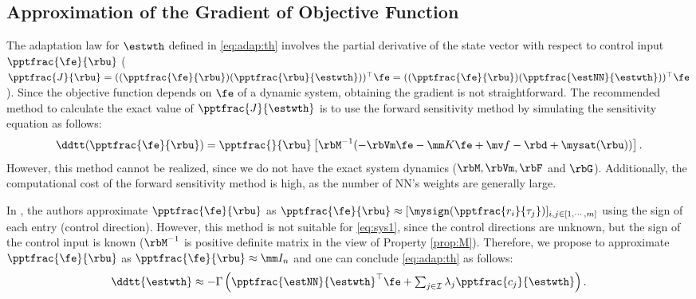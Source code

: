 \documentclass[final,5p,times,twocolumn,authoryear]{elsarticle}
\begin{document}
\subsection{Approximation of the Gradient of Objective Function}

The adaptation law for $\estwth$ defined in \eqref{eq:adap:th} involves the partial derivative of the state vector with respect to control input $\pptfrac{\fe}{\rbu}$ (\ie 
$
    \pptfrac{J}{\rbu}
    =
    ((\pptfrac{\fe}{\rbu})(\pptfrac{\rbu}{\estwth}))^\top \fe
    =
    ((\pptfrac{\fe}{\rbu})(\pptfrac{\estNN}{\estwth}))^\top \fe
$). 
Since the objective function depends on $\fe$ of a dynamic system, obtaining the gradient is not straightforward. 
The recommended method to calculate the exact value of $\pptfrac{J}{\estwth}$ is to use the forward sensitivity method \cite{Sengupta:2014aa} by simulating the sensitivity equation as follows: 
\begin{equation}
    \ddtt (
        \pptfrac{\fe}{\rbu}
    )
    =
    \pptfrac{}{
        \rbu
    }
    \left[
        \rbM^{-1}(
            -\rbVm \fe
            -\mm K \fe
            + \mv f
            -\rbd + \mysat(\rbu)
        )
    \right]
    .
\end{equation}
However, this method cannot be realized, since we do not have the exact system dynamics (\ie $\rbM,\rbVm, \rbF$ and $ \rbG$).
Additionally, the computational cost of the forward sensitivity method is high, as the number of NN's weights are generally large.

In \cite{Douratsos:2007aa,Saerens:1991aa}, the authors approximate $\pptfrac{\fe}{\rbu}$ as $
    \pptfrac{\fe}{\rbu}
    \approx
    [
        \mysign(\pptfrac{r_i}{\tau_j})
    ]_{i,j\in[1,\cdots,m]}
$ using the sign of each entry (\ie control direction).
However, this method is not suitable for \eqref{eq:sys1}, since the control directions are unknown, but the sign of the control input is known (\ie $\rbM^{-1}$ is positive definite matrix in the view of Property \ref{prop:M}).
Therefore, we propose to approximate $\pptfrac{\fe}{\rbu}$ as $\pptfrac{\fe}{\rbu}\approx \mm I_n$ and one can conclude \eqref{eq:adap:th} as follows:
\begin{equation}
    \ddtt{\estwth}
    \approx
    -\Gamma 
    \left(
        \pptfrac{\estNN}
        {\estwth}^\top
        \fe
        +
        \textstyle\sum_{j\in\mathcal{I}}
        \lambda_j 
        \pptfrac{c_j}{\estwth}
    \right)
    .
    \label{eq:adap:th:approx}
\end{equation}
\end{document}
